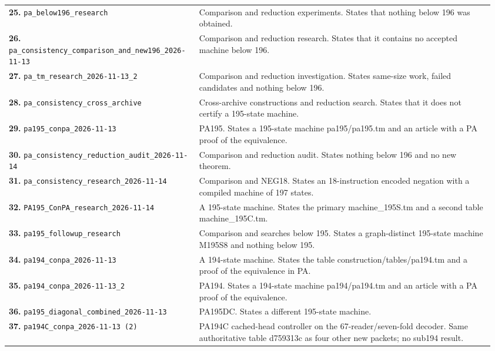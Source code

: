{\begin{longtable}{@{}>{\raggedright\arraybackslash}p{0.37\linewidth}>{\raggedright\arraybackslash}p{0.59\linewidth}@{}}
\textbf{25.} \nolinkurl{pa_below196_research} & Comparison and reduction experiments. States that nothing below 196 was obtained.\\[5pt]
\textbf{26.} \nolinkurl{pa_consistency_comparison_and_new196_2026-11-13} & Comparison and reduction research. States that it contains no accepted machine below 196.\\[5pt]
\textbf{27.} \nolinkurl{pa_tm_research_2026-11-13_2} & Comparison and reduction investigation. States same-size work, failed candidates and nothing below 196.\\[5pt]
\textbf{28.} \nolinkurl{pa_consistency_cross_archive} & Cross-archive constructions and reduction search. States that it does not certify a 195-state machine.\\[5pt]
\textbf{29.} \nolinkurl{pa195_conpa_2026-11-13} & PA195. States a 195-state machine pa195/pa195.tm and an article with a PA proof of the equivalence.\\[5pt]
\textbf{30.} \nolinkurl{pa_consistency_reduction_audit_2026-11-14} & Comparison and reduction audit. States nothing below 196 and no new theorem.\\[5pt]
\textbf{31.} \nolinkurl{pa_consistency_research_2026-11-14} & Comparison and NEG18. States an 18-instruction encoded negation with a compiled machine of 197 states.\\[5pt]
\textbf{32.} \nolinkurl{PA195_ConPA_research_2026-11-14} & A 195-state machine. States the primary machine\_195S.tm and a second table machine\_195C.tm.\\[5pt]
\textbf{33.} \nolinkurl{pa195_followup_research} & Comparison and searches below 195. States a graph-distinct 195-state machine M195S8 and nothing below 195.\\[5pt]
\textbf{34.} \nolinkurl{pa194_conpa_2026-11-13} & A 194-state machine. States the table construction/tables/pa194.tm and a proof of the equivalence in PA.\\[5pt]
\textbf{35.} \nolinkurl{pa194_conpa_2026-11-13_2} & PA194. States a 194-state machine pa194/pa194.tm and an article with a PA proof of the equivalence.\\[5pt]
\textbf{36.} \nolinkurl{pa195_diagonal_combined_2026-11-13} & PA195DC. States a different 195-state machine.\\[5pt]
\textbf{37.} \nolinkurl{pa194C_conpa_2026-11-13 (2)} & PA194C cached-head controller on the 67-reader/seven-fold decoder. Same authoritative table d759313c as four other new packets; no sub194 result.\\[5pt]

\end{longtable}}
